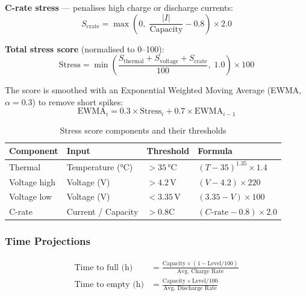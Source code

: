 \documentclass[12pt,a4paper]{report}
\begin{document}
\textbf{C-rate stress} — penalises high charge or discharge currents:
\begin{equation}
  S_{\text{crate}} = \max\!\left(0,\; \frac{|I|}{\text{Capacity}} - 0.8\right) \times 2.0
\end{equation}

\textbf{Total stress score} (normalised to 0--100):
\begin{equation}
  \text{Stress} = \min\!\left(\frac{S_{\text{thermal}} + S_{\text{voltage}} + S_{\text{crate}}}{100},\; 1.0\right) \times 100
\end{equation}

The score is smoothed with an Exponential Weighted Moving Average (EWMA,
$\alpha = 0.3$) to remove short spikes:
\begin{equation}
  \text{EWMA}_i = 0.3 \times \text{Stress}_i + 0.7 \times \text{EWMA}_{i-1}
\end{equation}

\begin{table}[H]
\caption{Stress score components and their thresholds}
\centering
\small
\begin{tabular}{llll}
\toprule
\textbf{Component} & \textbf{Input} & \textbf{Threshold} & \textbf{Formula}\\
\midrule
Thermal  & Temperature (°C) & $> 35$\,°C  & $(T-35)^{1.35} \times 1.4$\\
Voltage high & Voltage (V) & $> 4.2$\,V  & $(V-4.2) \times 220$\\
Voltage low  & Voltage (V) & $< 3.35$\,V & $(3.35-V) \times 100$\\
C-rate   & Current / Capacity & $> 0.8$C & $(C\text{-rate}-0.8) \times 2.0$\\
\bottomrule
\end{tabular}
\end{table}

\subsubsection{Time Projections}

\begin{align}
  \text{Time to full (h)} &= \frac{\text{Capacity} \times (1 - \text{Level}/100)}
                                   {\text{Avg.\ Charge Rate}}\\[4pt]
  \text{Time to empty (h)} &= \frac{\text{Capacity} \times \text{Level}/100}
                                    {\text{Avg.\ Discharge Rate}}
\end{align}
\end{document}
